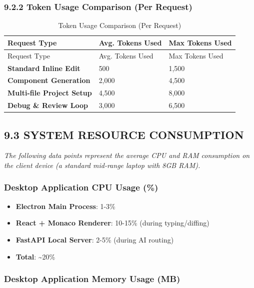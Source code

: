 \documentclass[
  12pt,
]{article}
\providecommand{\tightlist}{%
  \setlength{\itemsep}{0pt}\setlength{\parskip}{0pt}}
\begin{document}
\subsubsection{9.2.2 Token Usage Comparison (Per
Request)}\label{token-usage-comparison-per-request}

\begin{longtable}[]{@{}lll@{}}
\caption{Token Usage Comparison (Per Request)}\tabularnewline
\toprule\noalign{}
Request Type & Avg. Tokens Used & Max Tokens Used \\
\midrule\noalign{}
\endfirsthead
\toprule\noalign{}
Request Type & Avg. Tokens Used & Max Tokens Used \\
\midrule\noalign{}
\endhead
\bottomrule\noalign{}
\endlastfoot
\textbf{Standard Inline Edit} & 500 & 1,500 \\
\textbf{Component Generation} & 2,000 & 4,500 \\
\textbf{Multi-file Project Setup} & 4,500 & 8,000 \\
\textbf{Debug \& Review Loop} & 3,000 & 6,500 \\
\end{longtable}

\subsection{9.3 SYSTEM RESOURCE
CONSUMPTION}\label{system-resource-consumption}

\emph{The following data points represent the average CPU and RAM
consumption on the client device (a standard mid-range laptop with 8GB
RAM).}

\subsubsection{Desktop Application CPU Usage
(\%)}\label{desktop-application-cpu-usage}

\begin{itemize}
\tightlist
\item
  \textbf{Electron Main Process}: 1-3\%
\item
  \textbf{React + Monaco Renderer}: 10-15\% (during typing/diffing)
\item
  \textbf{FastAPI Local Server}: 2-5\% (during AI routing)
\item
  \textbf{Total}: \textasciitilde20\%
\end{itemize}

\subsubsection{Desktop Application Memory Usage
(MB)}\label{desktop-application-memory-usage-mb}
\end{document}
